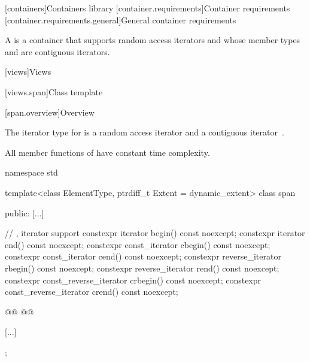 
\setcounter{chapter}{26}
[containers]{Containers library}
\setcounter{section}{1}
[container.requirements]{Container requirements}
[container.requirements.general]{General container requirements}


\setcounter{Paras}{12}
\pnum
{}%
A 
is a container that supports random access iterators
and whose member types  and 
are contiguous iterators.

\setcounter{section}{6}
[views]{Views}

\setcounter{subsection}{2}
[views.span]{Class template }

[span.overview]{Overview}

\setcounter{Paras}{3}
\pnum
The iterator type for  is a random access iterator and a contiguous
iterator~.

\pnum
All member functions of  have constant time complexity.

%
\begin{codeblock}
namespace std {
  template<class ElementType, ptrdiff_t Extent = dynamic_extent>
  class span {
  public:
    [...]

    // , iterator support
    constexpr iterator begin() const noexcept;
    constexpr iterator end() const noexcept;
    constexpr const_iterator cbegin() const noexcept;
    constexpr const_iterator cend() const noexcept;
    constexpr reverse_iterator rbegin() const noexcept;
    constexpr reverse_iterator rend() const noexcept;
    constexpr const_reverse_iterator crbegin() const noexcept;
    constexpr const_reverse_iterator crend() const noexcept;

    @@
    @@

    [...]
  };
}
\end{codeblock}
